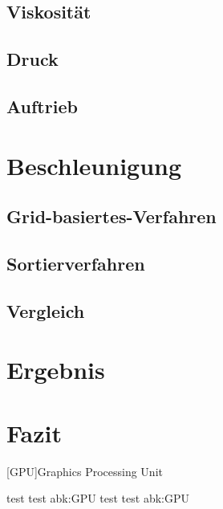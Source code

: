 \documentclass[intern,palatino]{cgBA}
\begin{document}
\subsection{Viskosität}
\subsection{Druck}
\subsection{Auftrieb}


\section{Beschleunigung}
\subsection{Grid-basiertes-Verfahren}
\subsection{Sortierverfahren}
\subsection{Vergleich}


\section{Ergebnis}


\section{Fazit}


\begin{acronym}
	[GPU]{Graphics Processing Unit}
\end{acronym}
test test \ac{abk:GPU} test test \acl{abk:GPU}

\cite{wiki:lol}

\end{document}
